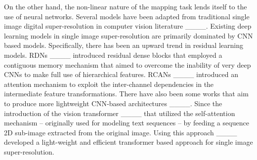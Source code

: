 On the other hand, the non-linear nature of the mapping task lends itself to the use of neural networks. Several models have been adapted from traditional single image digital super-resolution in computer vision literature ____. Existing deep learning models in single image super-resolution are primarily dominated by \ac{CNN} based models. Specifically, there has been an upward trend in residual learning models. \acp{RDN} ____ introduced residual dense blocks that employed a contiguous memory mechanism that aimed to overcome the inability of very deep \acp{CNN} to make full use of hierarchical features. 
\acp{RCAN} ____ introduced an attention mechanism to exploit the inter-channel dependencies in the intermediate feature transformations. There have also been some works that aim to produce more lightweight \ac{CNN}-based architectures ____. Since the introduction of the vision transformer ____ that utilized the self-attention mechanism -- originally used for modeling text sequences -- by feeding a sequence 2D sub-image extracted from the original image. Using this approach ____ developed a light-weight and efficient transformer based approach for single image super-resolution. 


